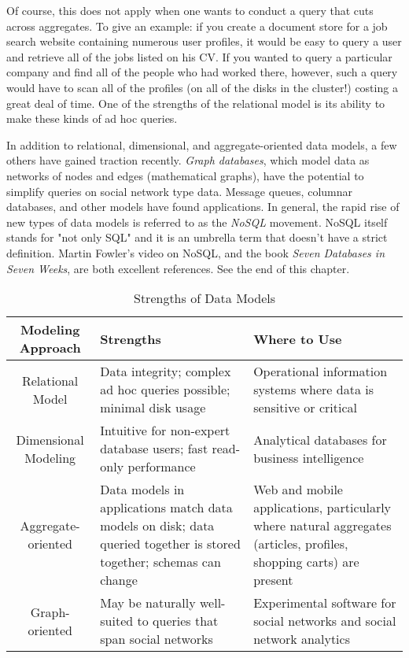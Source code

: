 \documentclass[11pt]{book}
\newcommand{\term}[1]{\emph{#1}} %
\newcommand{\head}[1]{\textnormal{\textbf{#1}}} %
\begin{document}
Of course, this does not apply when one wants to conduct a query that cuts across aggregates.  To give an example: if you create a document store for a job search website containing numerous user profiles, it would be easy to query a user and retrieve all of the jobs listed on his CV.  If you wanted to query a particular company and find all of the people who had worked there, however, such a query would have to scan all of the profiles (on all of the disks in the cluster!) costing a great deal of time.  One of the strengths of the relational model is its ability to make these kinds of ad hoc queries.

In addition to relational, dimensional, and aggregate-oriented data models, a few others have gained traction recently.  \term{Graph databases}, which model data as networks of nodes and edges (mathematical graphs), have the potential to simplify queries on social network type data.  Message queues, columnar databases, and other models have found applications.  In general, the rapid rise of new types of data models is referred to as the \term{NoSQL} movement.  NoSQL itself stands for "not only SQL" and it is an umbrella term that doesn't have a strict definition. Martin Fowler's video on NoSQL, and the book \textit{Seven Databases in Seven Weeks}, are both excellent references. See the end of this chapter.

\begin{table}
\centering
\caption{Strengths of Data Models}
\vspace{10pt}
\begin{tabular}{cp{4cm}p{4cm}}
    \toprule[1.5pt]
    \head{Modeling Approach} & \head{Strengths} & \head{Where to Use} \\
    \midrule
    Relational Model & Data integrity; complex ad hoc queries possible; minimal disk usage & Operational information systems where data is sensitive or critical\\
    \midrule
    Dimensional Modeling & Intuitive for non-expert database users; fast read-only performance & Analytical databases for business intelligence\\
    \midrule
    Aggregate-oriented & Data models in applications match data models on disk; data queried together is stored together; schemas can change & Web and mobile applications, particularly where natural aggregates (articles, profiles, shopping carts) are present \\
    \midrule
    Graph-oriented & May be naturally well-suited to queries that span social networks & Experimental software for social networks and social network analytics \\
    \bottomrule[1.5pt]
\end{tabular}
\end{table}
\end{document}
